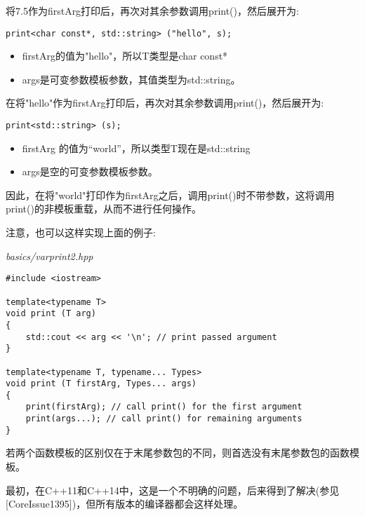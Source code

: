 将7.5作为firstArg打印后，再次对其余参数调用print()，然后展开为:

\begin{lstlisting}[style=styleCXX]
print<char const*, std::string> ("hello", s);
\end{lstlisting}

\begin{itemize}
\item 
firstArg的值为"hello"，所以T类型是char const*

\item 
args是可变参数模板参数，其值类型为std::string。
\end{itemize}

在将"hello"作为firstArg打印后，再次对其余参数调用print()，然后展开为:

\begin{lstlisting}[style=styleCXX]
print<std::string> (s);
\end{lstlisting}

\begin{itemize}
\item 
firstArg 的值为“world”，所以类型T现在是std::string

\item 
args是空的可变参数模板参数。
\end{itemize}

因此，在将"world"打印作为firstArg之后，调用print()时不带参数，这将调用print()的非模板重载，从而不进行任何操作。


注意，也可以这样实现上面的例子:

\noindent
\textit{basics/varprint2.hpp}
\begin{lstlisting}[style=styleCXX]
#include <iostream>

template<typename T>
void print (T arg)
{
	std::cout << arg << '\n'; // print passed argument
}

template<typename T, typename... Types>
void print (T firstArg, Types... args)
{
	print(firstArg); // call print() for the first argument
	print(args...); // call print() for remaining arguments
}
\end{lstlisting}

若两个函数模板的区别仅在于末尾参数包的不同，则首选没有末尾参数包的函数模板。

\begin{tcolorbox}[colback=webgreen!5!white,colframe=webgreen!75!black]
\hspace*{0.75cm}最初，在C++11和C++14中，这是一个不明确的问题，后来得到了解决(参见[CoreIssue1395])，但所有版本的编译器都会这样处理。
\end{tcolorbox}


